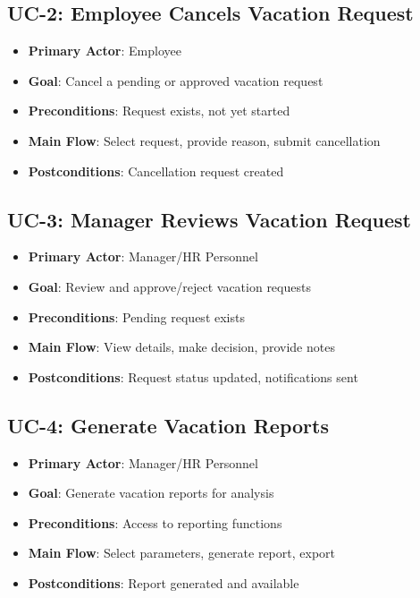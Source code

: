 \documentclass[12pt,a4paper]{article}
\begin{document}
\subsection{UC-2: Employee Cancels Vacation Request}
\begin{itemize}
    \item \textbf{Primary Actor}: Employee
    \item \textbf{Goal}: Cancel a pending or approved vacation request
    \item \textbf{Preconditions}: Request exists, not yet started
    \item \textbf{Main Flow}: Select request, provide reason, submit cancellation
    \item \textbf{Postconditions}: Cancellation request created
\end{itemize}

\subsection{UC-3: Manager Reviews Vacation Request}
\begin{itemize}
    \item \textbf{Primary Actor}: Manager/HR Personnel
    \item \textbf{Goal}: Review and approve/reject vacation requests
    \item \textbf{Preconditions}: Pending request exists
    \item \textbf{Main Flow}: View details, make decision, provide notes
    \item \textbf{Postconditions}: Request status updated, notifications sent
\end{itemize}

\subsection{UC-4: Generate Vacation Reports}
\begin{itemize}
    \item \textbf{Primary Actor}: Manager/HR Personnel
    \item \textbf{Goal}: Generate vacation reports for analysis
    \item \textbf{Preconditions}: Access to reporting functions
    \item \textbf{Main Flow}: Select parameters, generate report, export
    \item \textbf{Postconditions}: Report generated and available
\end{itemize}
\end{document}
